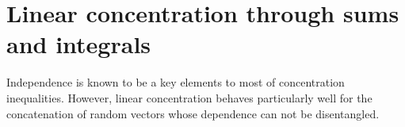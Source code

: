 \documentclass{ws-rmta}
\begin{document}
\section{Linear concentration through sums and integrals}
Independence is known to be a key elements to most of concentration inequalities.
However, linear concentration behaves particularly well for the concatenation of random vectors whose dependence can not be disentangled.
\end{document}
